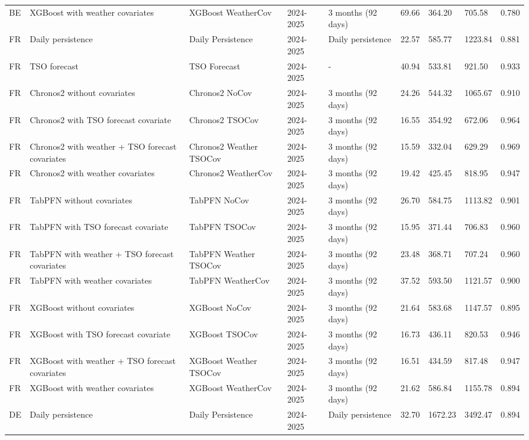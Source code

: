 \begin{longtable}{lllllllll}
BE & XGBoost with weather covariates & XGBoost WeatherCov & 2024-2025 & 3 months (92 days) & 69.66 & 364.20 & 705.58 & 0.780 \\
FR & Daily persistence & Daily Persistence & 2024-2025 & Daily persistence & 22.57 & 585.77 & 1223.84 & 0.881 \\
FR & TSO forecast & TSO Forecast & 2024-2025 & - & 40.94 & 533.81 & 921.50 & 0.933 \\
FR & Chronos2 without covariates & Chronos2 NoCov & 2024-2025 & 3 months (92 days) & 24.26 & 544.32 & 1065.67 & 0.910 \\
FR & Chronos2 with TSO forecast covariate & Chronos2 TSOCov & 2024-2025 & 3 months (92 days) & 16.55 & 354.92 & 672.06 & 0.964 \\
FR & Chronos2 with weather + TSO forecast covariates & Chronos2 Weather TSOCov & 2024-2025 & 3 months (92 days) & 15.59 & 332.04 & 629.29 & 0.969 \\
FR & Chronos2 with weather covariates & Chronos2 WeatherCov & 2024-2025 & 3 months (92 days) & 19.42 & 425.45 & 818.95 & 0.947 \\
FR & TabPFN without covariates & TabPFN NoCov & 2024-2025 & 3 months (92 days) & 26.70 & 584.75 & 1113.82 & 0.901 \\
FR & TabPFN with TSO forecast covariate & TabPFN TSOCov & 2024-2025 & 3 months (92 days) & 15.95 & 371.44 & 706.83 & 0.960 \\
FR & TabPFN with weather + TSO forecast covariates & TabPFN Weather TSOCov & 2024-2025 & 3 months (92 days) & 23.48 & 368.71 & 707.24 & 0.960 \\
FR & TabPFN with weather covariates & TabPFN WeatherCov & 2024-2025 & 3 months (92 days) & 37.52 & 593.50 & 1121.57 & 0.900 \\
FR & XGBoost without covariates & XGBoost NoCov & 2024-2025 & 3 months (92 days) & 21.64 & 583.68 & 1147.57 & 0.895 \\
FR & XGBoost with TSO forecast covariate & XGBoost TSOCov & 2024-2025 & 3 months (92 days) & 16.73 & 436.11 & 820.53 & 0.946 \\
FR & XGBoost with weather + TSO forecast covariates & XGBoost Weather TSOCov & 2024-2025 & 3 months (92 days) & 16.51 & 434.59 & 817.48 & 0.947 \\
FR & XGBoost with weather covariates & XGBoost WeatherCov & 2024-2025 & 3 months (92 days) & 21.62 & 586.84 & 1155.78 & 0.894 \\
DE & Daily persistence & Daily Persistence & 2024-2025 & Daily persistence & 32.70 & 1672.23 & 3492.47 & 0.894 \\

\end{longtable}
